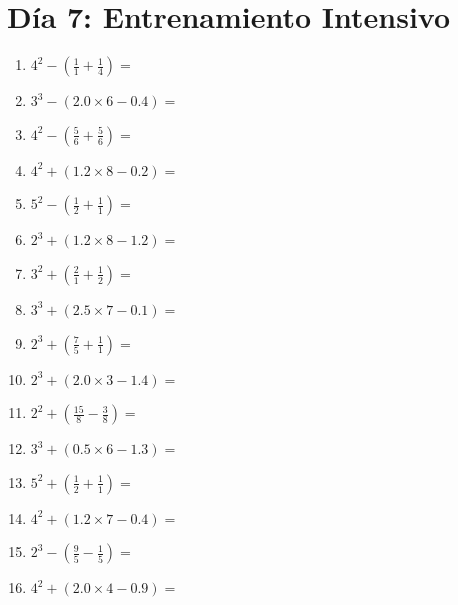 \documentclass[12pt]{article}
\begin{document}
\section*{Día 7: Entrenamiento Intensivo}
\begin{enumerate}
\item \large $ 4^{2} - (\frac{1}{1} + \frac{1}{4}) = $ \vspace{1.6cm}
\item \large $ 3^{3} - (2.0 \times 6 - 0.4) = $ \vspace{1.6cm}
\item \large $ 4^{2} - (\frac{5}{6} + \frac{5}{6}) = $ \vspace{1.6cm}
\item \large $ 4^{2} + (1.2 \times 8 - 0.2) = $ \vspace{1.6cm}
\item \large $ 5^{2} - (\frac{1}{2} + \frac{1}{1}) = $ \vspace{1.6cm}
\item \large $ 2^{3} + (1.2 \times 8 - 1.2) = $ \vspace{1.6cm}
\item \large $ 3^{2} + (\frac{2}{1} + \frac{1}{2}) = $ \vspace{1.6cm}
\item \large $ 3^{3} + (2.5 \times 7 - 0.1) = $ \vspace{1.6cm}
\item \large $ 2^{3} + (\frac{7}{5} + \frac{1}{1}) = $ \vspace{1.6cm}
\item \large $ 2^{3} + (2.0 \times 3 - 1.4) = $ \vspace{1.6cm}
\newpage
\item \large $ 2^{2} + (\frac{15}{8} - \frac{3}{8}) = $ \vspace{1.6cm}
\item \large $ 3^{3} + (0.5 \times 6 - 1.3) = $ \vspace{1.6cm}
\item \large $ 5^{2} + (\frac{1}{2} + \frac{1}{1}) = $ \vspace{1.6cm}
\item \large $ 4^{2} + (1.2 \times 7 - 0.4) = $ \vspace{1.6cm}
\item \large $ 2^{3} - (\frac{9}{5} - \frac{1}{5}) = $ \vspace{1.6cm}
\item \large $ 4^{2} + (2.0 \times 4 - 0.9) = $ \vspace{1.6cm}

\end{enumerate}
\end{document}
